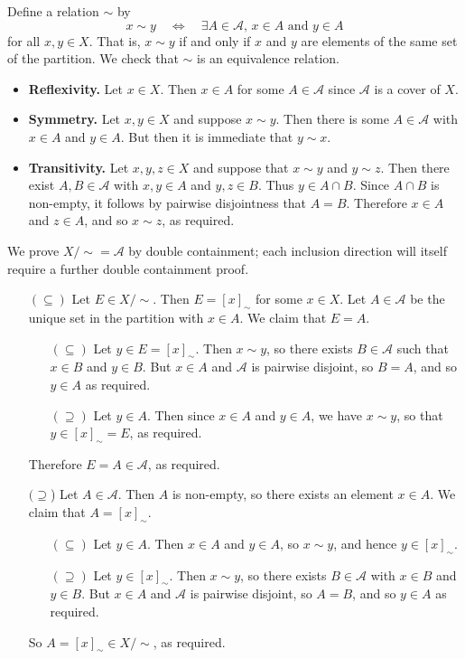 \begin{cproof}[{of (b)}]
Define a relation $\sim$ by
\[ x \sim y \quad \Leftrightarrow \quad \exists A \in \mathcal{A},\, x \in A \text{ and } y \in A \]
for all $x,y \in X$. That is, $x \sim y$ if and only if $x$ and $y$ are elements of the same set of the partition. We check that $\sim$ is an equivalence relation.
\begin{itemize}
\item \textbf{Reflexivity.} Let $x \in X$. Then $x \in A$ for some $A \in \mathcal{A}$ since $\mathcal{A}$ is a cover of $X$.
\item \textbf{Symmetry.} Let $x,y \in X$ and suppose $x \sim y$. Then there is some $A \in \mathcal{A}$ with $x \in A$ and $y \in A$. But then it is immediate that $y \sim x$.
\item \textbf{Transitivity.} Let $x,y,z \in X$ and suppose that $x \sim y$ and $y \sim z$. Then there exist $A,B \in \mathcal{A}$ with $x,y \in A$ and $y,z \in B$. Thus $y \in A \cap B$. Since $A \cap B$ is non-empty, it follows by pairwise disjointness that $A=B$. Therefore $x \in A$ and $z \in A$, and so $x \sim z$, as required.
\end{itemize}

We prove $X/{\sim} = \mathcal{A}$ by double containment; each inclusion direction will itself require a further double containment proof.
\begin{itemize}
\item[$(\subseteq)$] Let $E \in X/{\sim}$. Then $E = [x]_{\sim}$ for some $x \in X$. Let $A \in \mathcal{A}$ be the unique set in the partition with $x \in A$. We claim that $E=A$.
\begin{itemize}[leftmargin=20pt]
\item[$(\subseteq)$] Let $y \in E = [x]_{\sim}$. Then $x \sim y$, so there exists $B \in \mathcal{A}$ such that $x \in B$ and $y \in B$. But $x \in A$ and $\mathcal{A}$ is pairwise disjoint, so $B=A$, and so $y \in A$ as required.
\item[$(\supseteq)$] Let $y \in A$. Then since $x \in A$ and $y \in A$, we have $x \sim y$, so that $y \in [x]_{\sim} = E$, as required.
\end{itemize}
Therefore $E = A \in \mathcal{A}$, as required.
\item[$(\supseteq$)] Let $A \in \mathcal{A}$. Then $A$ is non-empty, so there exists an element $x \in A$. We claim that $A = [x]_{\sim}$.
\begin{itemize}[leftmargin=20pt]
\item[$(\subseteq)$] Let $y \in A$. Then $x \in A$ and $y \in A$, so $x \sim y$, and hence $y \in [x]_{\sim}$.
\item[$(\supseteq)$] Let $y \in [x]_{\sim}$. Then $x \sim y$, so there exists $B \in \mathcal{A}$ with $x \in B$ and $y \in B$. But $x \in A$ and $\mathcal{A}$ is pairwise disjoint, so $A=B$, and so $y \in A$ as required.
\end{itemize}
So $A = [x]_{\sim} \in X/{\sim}$, as required.
\end{itemize}


\end{cproof}
